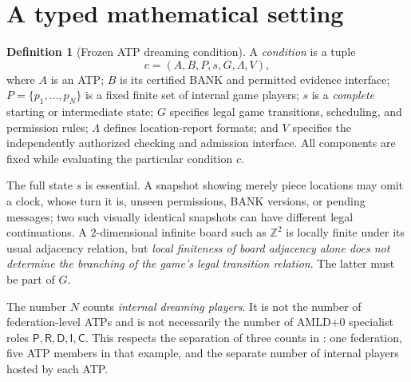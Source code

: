 \documentclass[11pt,letterpaper]{article}
\theoremstyle{definition}
\newtheorem{definition}[theorem]{Definition}
\theoremstyle{remark}
\newcommand{\status}[1]{\textsf{#1}}
\begin{document}
\section{A typed mathematical setting}
\begin{definition}[Frozen ATP dreaming condition]
A \emph{condition} is a tuple
\begin{equation}\label{eq:condition}
 c=(A,B,P,s,G,\Lambda,V),
\end{equation}
where $A$ is an ATP; $B$ is its certified BANK and permitted evidence interface; $P=\{p_1,\ldots,p_N\}$ is a fixed finite set of internal game players; $s$ is a \emph{complete} starting or intermediate state; $G$ specifies legal game transitions, scheduling, and permission rules; $\Lambda$ defines location-report formats; and $V$ specifies the independently authorized checking and admission interface. All components are fixed while evaluating the particular condition $c$.
\end{definition}
The full state $s$ is essential. A snapshot showing merely piece locations may omit a clock, whose turn it is, unseen permissions, BANK versions, or pending messages; two such visually identical snapshots can have different legal continuations. A $2$-dimensional infinite board such as $\mathbb Z^2$ is locally finite under its usual adjacency relation, but \emph{local finiteness of board adjacency alone does not determine the branching of the game's legal transition relation}. The latter must be part of $G$.

The number $N$ counts \emph{internal dreaming players}. It is not the number of federation-level ATPs and is not necessarily the number of AMLD+0 specialist roles $\status{P},\status{R},\status{D},\status{I},\status{C}$. This respects the separation of three counts in \cite{tenneson-dreaming}: one federation, five ATP members in that example, and the separate number of internal players hosted by each ATP.
\end{document}
